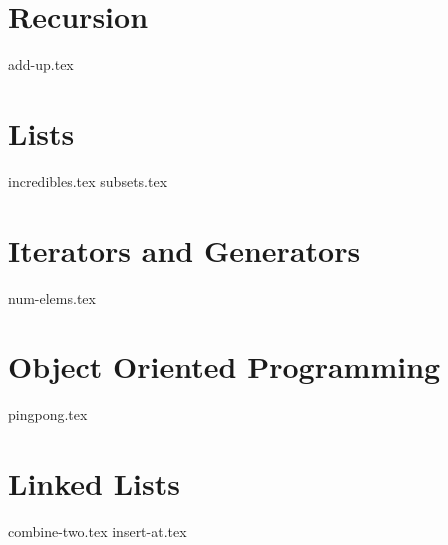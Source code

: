 \documentclass{exam}
\begin{document}
\section{Recursion}
\begin{questions}
    {add-up.tex}
\end{questions}

\section{Lists}
\begin{questions}
    {incredibles.tex}
    {subsets.tex}
\end{questions}

\newpage

\section{Iterators and Generators}
\begin{questions}
    {num-elems.tex}
\end{questions}

\section{Object Oriented Programming}
\begin{questions}
    {pingpong.tex}
\end{questions}

\section{Linked Lists}
\begin{questions}
    {combine-two.tex}
    {insert-at.tex}
\end{questions}
\end{document}
